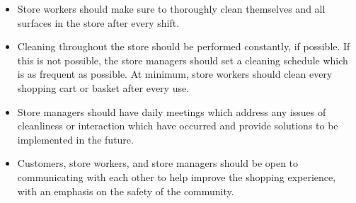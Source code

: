 \documentclass[onecolumn,journal]{IEEEtran}
\begin{document}
\begin{multicols}{2}
\begin{itemize}
    \item Store workers should make sure to thoroughly clean themselves and all surfaces in the store after every shift.
    
    \item Cleaning throughout the store should be performed constantly, if possible. If this is not possible, the store managers should set a cleaning schedule which is as frequent as possible. At minimum, store workers should clean every shopping cart or basket after every use.
    
    \item Store managers should have daily meetings which address any issues of cleanliness or interaction which have occurred and provide solutions to be implemented in the future.
    
    \item Customers, store workers, and store managers should be open to communicating with each other to help improve the shopping experience, with an emphasis on the safety of the community.
\end{itemize}

\end{multicols}
		

	
% 
\end{document}
